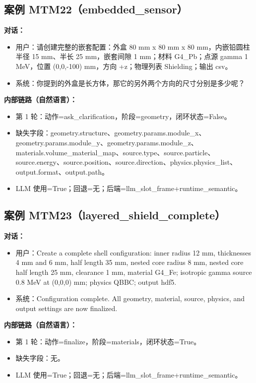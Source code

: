 \documentclass[11pt]{ctexart}
\begin{document}
\subsection{案例 MTM22（embedded\_sensor）}
\textbf{对话：}
\begin{itemize}
\item 用户：请创建完整的嵌套配置：外盒 80 mm x 80 mm x 80 mm，内嵌铅圆柱半径 15 mm、半长 25 mm，嵌套间隙 1 mm；材料 G4\_Pb；点源 gamma 1 MeV，位置 (0,0,-100) mm，方向 +z；物理列表 Shielding；输出 csv。
\item 系统：你提到的外盒是长方体，那它的另外两个方向的尺寸分别是多少呢？
\end{itemize}
\textbf{内部链路（自然语言）：}
\begin{itemize}
\item 第 1 轮：动作=ask\_clarification，阶段=geometry，闭环状态=False。
\item 缺失字段：geometry.structure、geometry.params.module\_x、geometry.params.module\_y、geometry.params.module\_z、materials.volume\_material\_map、source.type、source.particle、source.energy、source.position、source.direction、physics.physics\_list、output.format、output.path。
\item LLM 使用=True；回退=无；后端=llm\_slot\_frame+runtime\_semantic。
\end{itemize}
\subsection{案例 MTM23（layered\_shield\_complete）}
\textbf{对话：}
\begin{itemize}
\item 用户：Create a complete shell configuration: inner radius 12 mm, thicknesses 4 mm and 6 mm, half length 35 mm, nested core radius 8 mm, nested core half length 25 mm, clearance 1 mm, material G4\_Fe; isotropic gamma source 0.8 MeV at (0,0,0) mm; physics QBBC; output hdf5.
\item 系统：Configuration complete. All geometry, material, source, physics, and output settings are now finalized.
\end{itemize}
\textbf{内部链路（自然语言）：}
\begin{itemize}
\item 第 1 轮：动作=finalize，阶段=materials，闭环状态=True。
\item 缺失字段：无。
\item LLM 使用=True；回退=无；后端=llm\_slot\_frame+runtime\_semantic。
\end{itemize}
\end{document}
